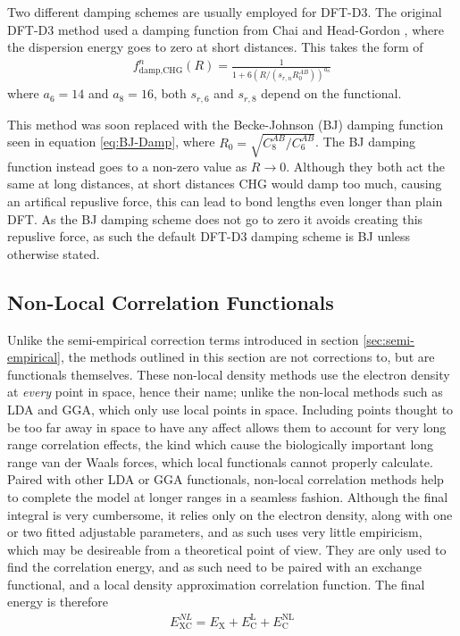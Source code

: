 \documentclass[10pt,a4paper,twocolumn,twoside]{extarticle}
\begin{document}
	Two different damping schemes are usually employed for DFT-D3. The original DFT-D3 method used a damping function from Chai and Head-Gordon \cite{Chai-Gordon-Damp}, where the dispersion energy goes to zero at short distances. 
	This takes the form of 
	\begin{align}
		f^n_\text{damp,CHG}(R) = \frac{1}{1 + 6(R/(s_{r,n}R_0^{AB}))^{a_n}} 
	\end{align}
	where $a_6 = 14$ and $a_8 = 16$, both $s_{r,6}$ and $s_{r,8}$ depend on the functional. 
	
	This method was soon replaced with the Becke-Johnson (BJ) damping function\cite{BJ-Damp} seen in equation \ref{eq:BJ-Damp}, where $R_0 = \sqrt{C_8^{AB}/C_6^{AB}}$. The BJ damping function instead goes to a non-zero value as $R \rightarrow 0$. Although they both act the same at long distances, at short distances CHG would damp too much, causing an artifical repuslive force, this can lead to bond lengths even longer than plain DFT. As the BJ damping scheme does not go to zero it avoids creating this repuslive force, as such the default DFT-D3 damping scheme is BJ unless otherwise stated.\cite{D3-Damp}



	\subsection{Non-Local Correlation Functionals}
	\label{sec:NL}
	Unlike the semi-empirical correction terms introduced in section \ref{sec:semi-empirical}, the methods outlined in this section are not corrections to, but are functionals themselves. These non-local density methods use the electron density at \emph{every} point in space, hence their name; unlike the non-local methods such as LDA and GGA, which only use local points in space. Including points thought to be too far away in space to have any affect allows them to account for very long range correlation effects, the kind which cause the biologically important long range van der Waals forces, which local functionals cannot properly calculate. Paired with other LDA or GGA functionals, non-local correlation methods help to complete the model at longer ranges in a seamless fashion. Although the final integral is very cumbersome, it relies only on the electron density, along with one or two fitted adjustable parameters, and as such uses very little empiricism, which may be desireable from a theoretical point of view. They are only used to find the correlation energy, and as such need to be paired with an exchange functional, and a local density approximation correlation function. The final energy is therefore
	\begin{align}
		E_\text{XC}^{NL} = E_\text{X} + E_\text{C}^\text{L} + E_\text{C}^\text{NL}
	\end{align} 
\end{document}
